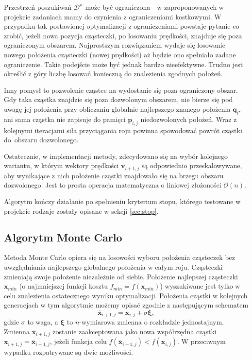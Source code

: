 \documentclass[11pt, a4paper, oneside]{article}
\newcommand{\vect}[1]{\bm{\mathbf{#1}}}
\begin{document}
Przestrzeń poszukiwań $\mathcal{D}^{n}$ może być ograniczona - w zaproponowanych w projekcie zadaniach mamy do czynienia z ograniczeniami kostkowymi. W przypadku tak postawionej optymalizacji z ograniczeniami powstaje pytanie co zrobić, jeżeli nowa pozycja cząsteczki, po losowaniu prędkości, znajduje się poza ograniczonym obszarem. Najprostszym rozwiązaniem wydaje się losowanie nowego położenia cząsteczki (nowej prędkości) aż będzie ono spełniało zadane ograniczenie. Takie podejście może być jednak bardzo nieefektywne. Trudno jest określić z góry liczbę losowań konieczną do znalezienia zgodnych położeń.

Inny pomysł to pozwolenie cząstce na wydostanie się poza ograniczony obszar. Gdy taka cząstka znajdzie się poza dozwolonym obszarem, nie bierze się pod uwagę jej położenia przy obliczaniu globalnie najlepszego znanego położenia $\vect{q}_{i}$, ani sama cząstka nie zapisuje do pamięci $\vect{p}_{i, j}$ niedozwolonych położeń. Wraz z kolejnymi iteracjami siła przyciągania roju powinna spowodować powrót cząstki do~obszaru dozwolonego.

Ostatecznie, w implementacji metody, zdecydowano się na wybór kolejnego wariantu, w którym wektory prędkości $\vect{v}_{i + 1, j}$ są odpowiednio przeskalowywane, aby wynikające z nich położenie cząstki znajdowało się na brzegu obszaru dozwolonego. Jest to prosta operacja matematyczna o liniowej złożoności $\mathcal{O}\left(n\right)$.

Algorytm kończy działanie po spełnieniu kryterium stopu, którego testowane w projekcie rodzaje zostały opisane w sekcji \ref{sec:stop}.

\subsection{Algorytm Monte Carlo} 

Metoda Monte Carlo opiera się na losowości wyboru położenia cząsteczek bez uwzględniania najlepszego globalnego położenia w całym roju. Cząsteczki zmieniają swoje położenie niezależnie od siebie. Położenie najlepszej cząsteczki $\vect{x}_{min}$ (o najmniejszej funkcji kosztu $f_{min} = f\left(\vect{x}_{min}\right)$) wyszukiwane jest tylko w celu znalezienia ostatecznego wyniku optymalizacji. Położenia cząstki w kolejnych generacjach w tym algorytmie możemy opisać zgodnie z następującym schematem
\begin{equation}
\vect{\overline{x}}_{i + 1, j} = \vect{x}_{i, j} + \sigma\vect{\xi},
\end{equation}
gdzie $\sigma$ to waga, a $\vect{\xi}$ to $n$-wymiarowa zmienna o rozkładzie jednostajnym. Zmienna $\vect{\overline{x}}_{i + 1, j}$ zostanie zaakceptowana jako nowa współrzędna cząstki $\vect{x}_{i + 1, j} = \vect{\overline{x}}_{i + 1, j}$, jeżeli funkcja celu $f\left(\vect{\overline{x}}_{i + 1, j}\right) < f\left(\vect{x}_{i, j}\right)$. W przeciwnym wypadku rozpatrywane są dwie możliwości.
\end{document}
